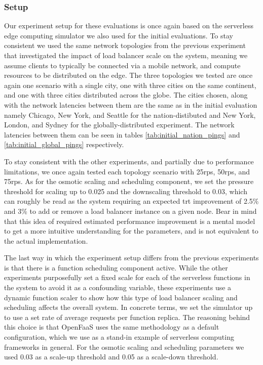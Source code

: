 \documentclass[draft,final]{vutinfth} %
\begin{document}
\subsubsection{Setup}
Our experiment setup for these evaluations is once again based on the serverless edge computing simulator we also used for the initial evaluations. To stay consistent we used the same network topologies from the previous experiment that investigated the impact of load balancer scale on the system, meaning we assume clients to typically be connected via a mobile network, and compute resources to be distributed on the edge. The three topologies we tested are once again one scenario with a single city, one with three cities on the same continent, and one with three cities distributed across the globe. The cities chosen, along with the network latencies between them are the same as in the initial evaluation namely Chicago, New York, and Seattle for the nation-distibuted and New York, London, and Sydney for the globally-distributed experiment. The network latencies between them can be seen in tables \ref{tab:initial_nation_pings} and \ref{tab:initial_global_pings} respectively.

To stay consistent with the other experiments, and partially due to performance limitations, we once again tested each topology scenario with 25\gls{rps}, 50\gls{rps}, and 75\gls{rps}. As for the osmotic scaling and scheduling component, we set the pressure threshold for scaling up to 0.025 and the downscaling threshold to 0.03, which can roughly be read as the system requiring an expected \gls{trt} improvement of 2.5\% and 3\% to add or remove a load balancer instance on a given node. Bear in mind that this idea of required estimated performance improvement is a mental model to get a more intuitive understanding for the parameters, and is not equivalent to the actual implementation.

The last way in which the experiment setup differs from the previous experiments is that there is a function scheduling component active. While the other experiments purposefully set a fixed scale for each of the serverless functions in the system to avoid it as a confounding variable, these experiments use a dynamic function scaler to show how this type of load balancer scaling and scheduling affects the overall system.
In concrete terms, we set the simulator up to use a set rate of average requests per function replica.
The reasoning behind this choice is that OpenFaaS uses the same methodology as a default configuration, which we use as a stand-in example of serverless computing frameworks in general.
For the osmotic scaling and scheduling parameters we used 0.03 as a scale-up threshold and 0.05 as a scale-down threshold.
\end{document}
